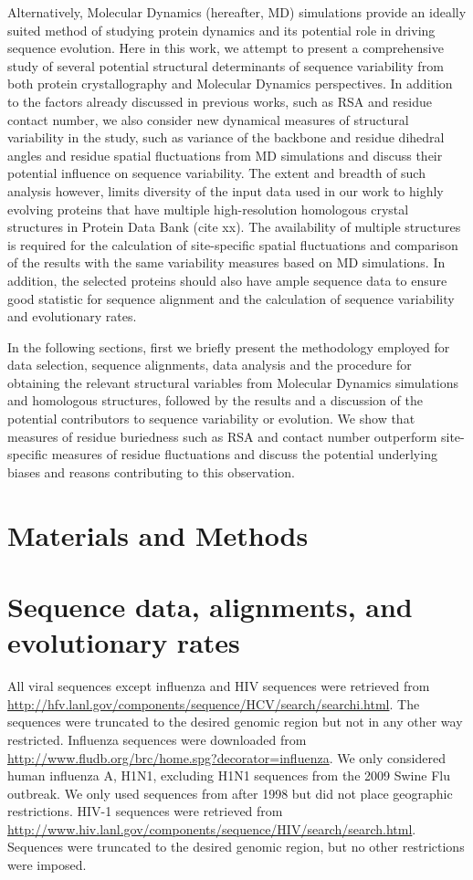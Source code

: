 \documentclass[12pt]{article}
\begin{document}
Alternatively, Molecular Dynamics (hereafter, MD) simulations provide an ideally suited method of studying protein dynamics and its potential role in driving sequence evolution.  Here in this work, we attempt to present a comprehensive study of several potential structural determinants of sequence variability from both protein crystallography and Molecular Dynamics perspectives. In addition to the factors already discussed in previous works, such as RSA and residue contact number, we also consider new dynamical measures of structural variability in the study, such as variance of the backbone and residue dihedral angles and residue spatial fluctuations from MD simulations and discuss their potential influence on sequence variability. The extent and breadth of such analysis however, limits diversity of the input data used in our work to highly evolving proteins that have multiple high-resolution homologous crystal structures in Protein Data Bank (cite xx). The availability of multiple structures is required for the calculation of site-specific spatial fluctuations and comparison of the results with the same variability measures based on MD simulations. In addition, the selected proteins should also have ample sequence data to ensure good statistic for sequence alignment and the calculation of sequence variability and evolutionary rates.
	
In the following sections, first we briefly present the methodology employed for data selection, sequence alignments, data analysis and the procedure for obtaining the relevant structural variables from Molecular Dynamics simulations and homologous structures, followed by the results and a discussion of the potential contributors to sequence variability or evolution. We show that measures of residue buriedness such as RSA and contact number outperform site-specific measures of residue fluctuations and discuss the potential underlying biases and reasons contributing to this observation.

\section*{Materials and Methods}

\section*{Sequence data, alignments, and evolutionary rates}

All viral sequences except influenza and HIV sequences were retrieved from \url{http://hfv.lanl.gov/components/sequence/HCV/search/searchi.html}.
The sequences were truncated to the desired genomic region but not in any other way restricted. Influenza sequences were downloaded from \url{http://www.fludb.org/brc/home.spg?decorator=influenza}. We only considered human influenza A, H1N1, excluding H1N1 sequences from the 2009 Swine Flu outbreak. We only used sequences from after 1998 but did not place geographic restrictions. HIV-1 sequences were retrieved from \url{http://www.hiv.lanl.gov/components/sequence/HIV/search/search.html}.
Sequences were truncated to the desired genomic region, but no other restrictions were imposed.
\end{document}
